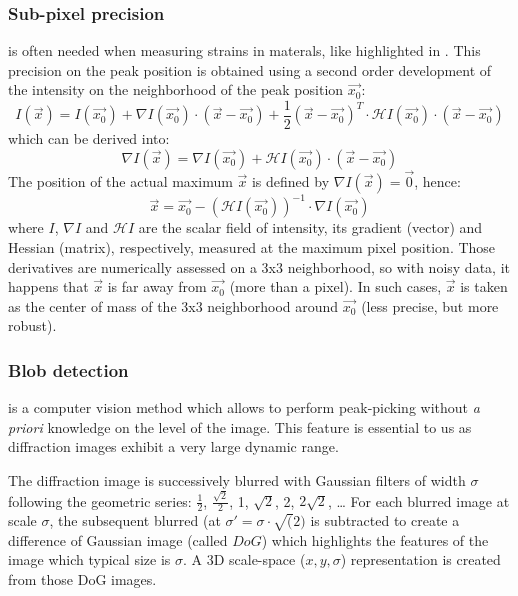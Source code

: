 \documentclass[preprint]{iucr}
\begin{document}
\subsubsection{Sub-pixel precision} 
\label{subpixel}
is often needed when measuring strains in materals, like highlighted in 
\cite{to5079}.
This precision on the peak position is obtained using a second order
development of the intensity on the neighborhood of the peak position $\overrightarrow{x_0}$:
$$ I(\overrightarrow{x}) = I(\overrightarrow{x_0}) + \nabla
I(\overrightarrow{x_0})\cdot (\overrightarrow{x}-\overrightarrow{x_0}) +
\frac{1}{2} (\overrightarrow{x}-\overrightarrow{x_0})^T\cdot\mathcal{H}
I(\overrightarrow{x_0})\cdot(\overrightarrow{x}-\overrightarrow{x_0})$$ which
can be derived into:
$$\nabla I(\overrightarrow{x}) =\nabla I(\overrightarrow{x_0}) +
\mathcal{H}I(\overrightarrow{x_0})\cdot(\overrightarrow{x}-\overrightarrow{x_0})$$
The position of the actual maximum $\overrightarrow{x}$ is defined by
$\nabla I(\overrightarrow{x})=\overrightarrow{0}$, hence:
$$\overrightarrow{x} = \overrightarrow{x_0} - (\mathcal{H}
I(\overrightarrow{x_0}))^{-1}\cdot\nabla I(\overrightarrow{x_0})$$ where $I$,
$\nabla I$ and $\mathcal{H} I$ are the scalar field of intensity, its gradient
(vector) and Hessian (matrix), respectively, measured at the maximum pixel position.
Those derivatives are numerically assessed on a 3x3 neighborhood, so with noisy
data, it happens that $\overrightarrow{x}$ is far away from
$\overrightarrow{x_0}$ (more than a pixel). In such cases, $\overrightarrow{x}$
is taken as the center of mass of the 3x3 neighborhood around
$\overrightarrow{x_0}$ (less precise, but more robust).

\subsubsection{Blob detection}
\label{blob}
is a computer vision method which allows to perform peak-picking without
\textit{a priori} knowledge on the level of the image.
This feature is essential to us as diffraction images exhibit a very large
dynamic range.

The diffraction image is successively blurred with Gaussian filters of
width $\sigma$ following the geometric series: $\frac{1}{2}$,
$\frac{\sqrt{2}}{2}$, 1, $\sqrt{2}$, 2, $2\sqrt{2}$, \ldots
For each blurred image at scale $\sigma$, the subsequent blurred (at
$\sigma'=\sigma\cdot\sqrt(2)$
is subtracted to create a difference of Gaussian
image (called $DoG$) which highlights the features of the image which typical
size is $\sigma$.
A 3D scale-space ($x,y,\sigma$) representation is created from those DoG images.
\end{document}
